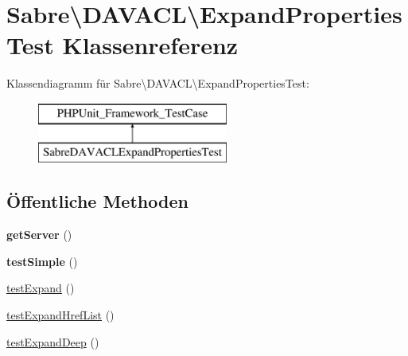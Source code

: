 \hypertarget{class_sabre_1_1_d_a_v_a_c_l_1_1_expand_properties_test}{}\section{Sabre\textbackslash{}D\+A\+V\+A\+CL\textbackslash{}Expand\+Properties\+Test Klassenreferenz}
\label{class_sabre_1_1_d_a_v_a_c_l_1_1_expand_properties_test}
Klassendiagramm für Sabre\textbackslash{}D\+A\+V\+A\+CL\textbackslash{}Expand\+Properties\+Test\+:\begin{figure}[H]
\begin{center}
\leavevmode
\includegraphics[height=2.000000cm]{class_sabre_1_1_d_a_v_a_c_l_1_1_expand_properties_test}
\end{center}
\end{figure}
\subsection*{Öffentliche Methoden}
\begin{DoxyCompactItemize}
\item 
\mbox{\label{class_sabre_1_1_d_a_v_a_c_l_1_1_expand_properties_test_a054cba4b4d3649fb62d3c99fdb8efb24}} 
{\bfseries get\+Server} ()
\item 
\mbox{\label{class_sabre_1_1_d_a_v_a_c_l_1_1_expand_properties_test_a8447b4e72f634a361266b19887b407dd}} 
{\bfseries test\+Simple} ()
\item 
\mbox{\hyperlink{class_sabre_1_1_d_a_v_a_c_l_1_1_expand_properties_test_a561472990c7d43d29df7753994bf03bc}{test\+Expand}} ()
\item 
\mbox{\hyperlink{class_sabre_1_1_d_a_v_a_c_l_1_1_expand_properties_test_a31968a48c8a6a6034c33011d928348aa}{test\+Expand\+Href\+List}} ()
\item 
\mbox{\hyperlink{class_sabre_1_1_d_a_v_a_c_l_1_1_expand_properties_test_ac83b4133d156109e60a761eae985b395}{test\+Expand\+Deep}} ()
\end{DoxyCompactItemize}


